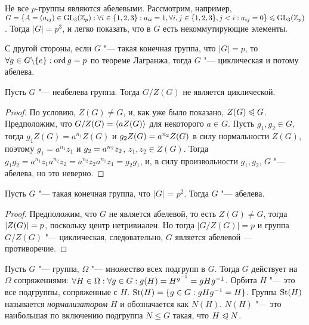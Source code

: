 \begin{example}
	Не все $p$-группы являются абелевыми. Рассмотрим, например, $G = \{A = (a_{ij}) \hm\in \GL_3(\Z_p): \forall i \in \{1, 2, 3\}: a_{ii} = 1, \forall i, j \hm\in \{1, 2, 3\}, j < i: a_{ij} = 0\} \le \GL_3(\Z_p)$. Тогда $|G| = p^3$, и легко показать, что в $G$ есть некоммутирующие элементы.
	
	С другой стороны, если $G$ "--- такая конечная группа, что $|G| = p$, то $\forall g \in G \bs \{e\}: \ord{g} \hm= p$ по теореме Лагранжа, тогда $G$ "--- циклическая и потому абелева.
\end{example}

\begin{theorem}
	Пусть $G$ "--- неабелева группа. Тогда $G / Z(G)$ не является циклической.
\end{theorem}

\begin{proof}
	По условию, $Z(G) \ne G$, и, как уже было показано, $Z(G) \trianglelefteqslant G$. Предположим, что $G / Z(G) = \langle aZ(G)\rangle$ для некоторого $a \in G$. Пусть $g_1, g_2 \in G$, тогда $g_1Z(G) = a^{n_1}Z(G)$ и $g_2Z(G) \hm= a^{n_2}Z(G)$ в силу нормальности $Z(G)$, поэтому $g_1 = a^{n_1}z_1$ и $g_2 \hm= a^{n_2}z_2$, $z_1, z_2 \in Z(G)$. Тогда $g_1g_2 = a^{n_1}z_1a^{n_2}z_2 = a^{n_2}z_2a^{n_1}z_1 = g_2g_1$, и, в силу произвольности $g_1, g_2$, $G$ "--- абелева, но это неверно.
\end{proof}

\begin{corollary}
	Пусть $G$ "--- такая конечная группа, что $|G|$ = $p^2$. Тогда $G$ "--- абелева.
\end{corollary}

\begin{proof}
	Предположим, что $G$ не является абелевой, то есть $Z(G) \ne G$, тогда $|Z(G)| \hm= p$, поскольку центр нетривиален. Но тогда $|G / Z(G)| = p$ и группа $G / Z(G)$ "--- циклическая, следовательно, $G$ является абелевой --- противоречие.
\end{proof}

\begin{example}
	Пусть $G$ "--- группа, $\Omega$ "--- множество всех подгрупп в $G$. Тогда $G$ действует на $\Omega$ сопряжениями: $\forall H \in \Omega: \forall g \in G: g(H) \hm= H^{g^{-1}} \hm= gHg^{-1}$. Орбита $H$ "--- это все подгруппы, сопряженные с $H$. $\St(H) \hm= \{g \in G: gHg^{-1} = H\}$. Группа $\operatorname{St}(H)$ называется \textit{нормализатором} $H$ и обозначается как $N(H)$. $N(H)$ "--- это наибольшая по включению подгруппа $N \le G$ такая, что $H \trianglelefteqslant N$.
\end{example}